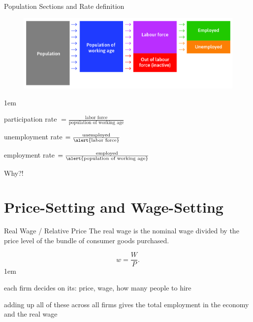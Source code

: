 \documentclass[11pt,aspectratio=43,usenames,dvipsnames]{beamer}
\let\olditemize=\itemize
\let\endolditemize=\enditemize
\renewenvironment{itemize}{\olditemize \itemsep1em}{\endolditemize}
\let\oldenumerate=\enumerate
\let\endoldenumerate=\endenumerate
\renewenvironment{enumerate}{\oldenumerate \itemsep1em}{ \endoldenumerate}
\theoremstyle{definition}
\begin{document}
\begin{frame}{Population Sections and Rate definition}
\label{slide:Population_Sections}
    \begin{figure}
        \centering
        \includegraphics[width=\textwidth]{./figures/employmentPop.jpg}
    \end{figure}

    \begin{itemize}
        \item participation rate $ =  \frac{\text{labor force}}{\text{population of working age}}$
        \item unemployment rate $ = \frac{\text{unemployed}}{\alert{\text{labor force}}} $
        \item employment rate $ = \frac{\text{employed}}{\alert{\text{population of working age}}} $
        \item Why?! \faFrownO
    \end{itemize}

\end{frame}

\section[P\&W]{Price-Setting and Wage-Setting}
\label{sec:Price_Setting_and_Wage_Setting}

\begin{frame}{Real Wage / Relative Price}
\label{slide:Real_Wage___Relative_Price}
    The real wage is the nominal wage divided by the price level of the bundle of consumer goods purchased.

    \begin{equation*}
        w = \frac{W}{P}
    .\end{equation*}
    \begin{enumerate}
        \item each firm decides on its: price, wage, how many people to hire
        \item adding up all of these across all firms gives the total employment in the economy and the real wage
    \end{enumerate}

\end{frame}
\end{document}
